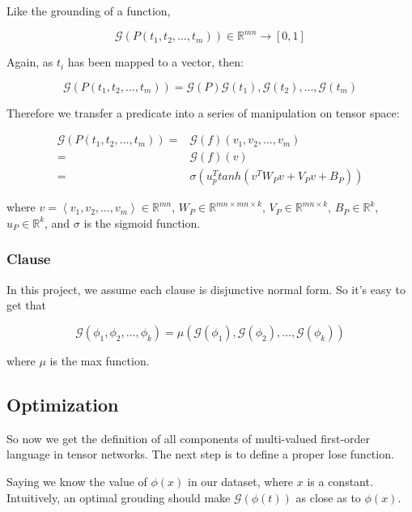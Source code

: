 Like the grounding of a function,

\begin{equation}
    \mathcal{G}(P(t_1,t_2,\dots,t_m)) \in \mathbb{R}^{mn}\rightarrow [0,1]
\end{equation}

Again, as $t_i$ has been mapped to a vector, then:

\begin{equation}
    \mathcal{G}(P(t_1,t_2,\dots,t_m))=\mathcal{G}(P)\mathcal{G}(t_1),\mathcal{G}(t_2),\dots,\mathcal{G}(t_m)
\end{equation}

Therefore we transfer a predicate into a series of manipulation on tensor space:

\begin{align}
    \mathcal{G}(P(t_1,t_2,\dots,t_m))=&\mathcal{G}(f)(v_1,v_2,\dots,v_m) \nonumber \\
    =&\mathcal{G}(f)(v) \nonumber \\
    =&\sigma(u_p^T tanh(v^{T} W_{P} v +V_Pv+B_P))
\end{align}

where $v=\left< v_1,v_2,\dots,v_m \right> \in \mathbb{R}^{mn} $, $W_P \in \mathbb{R}^{mn \times mn \times k}$, $V_P \in \mathbb{R}^{mn \times k}$, $B_P \in \mathbb{R}^{k}$, $u_P \in \mathbb{R}^{k}$, and $\sigma$ is the sigmoid function.

\subsubsection{Clause}

In this project, we assume each clause is disjunctive normal form. So it's easy to get that

\begin{equation}
    \mathcal{G}(\phi_1, \phi_2, \dots, \phi_k)=\mu(\mathcal{G}(\phi_1),\mathcal{G}(\phi_2),\dots,\mathcal{G}(\phi_k))
\end{equation}

where $\mu$ is the max function.

\subsection{Optimization}

So now we get the definition of all components of multi-valued first-order language in tensor networks. The next step is to define a proper lose function.

Saying we know the value of $\phi(x)$ in our dataset, where $x$ is a constant. Intuitively, an optimal grouding should make $\mathcal{G}(\phi(t))$ as close as to $\phi(x)$.
